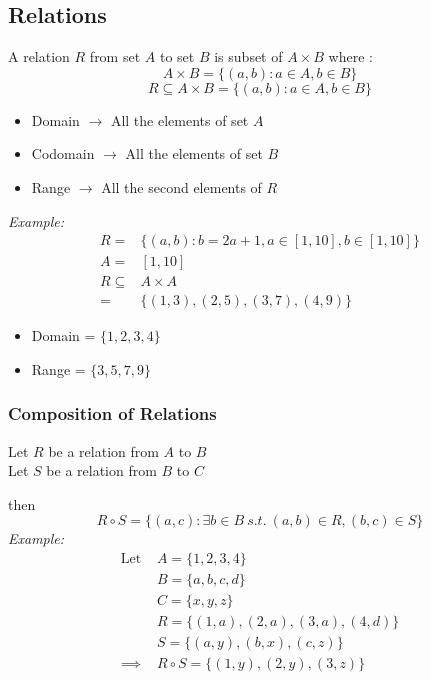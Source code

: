 \documentclass[11pt,letterpaper]{article}
\newenvironment{example}                             
        {\noindent\textit{Example:}\\}
	{}
\begin{document}
\subsection{Relations}
A relation $R$ from set $A$ to set $B$ is subset of $A\times B$ where :
\[
  A\times B = \{(a,b) : a\in A, b\in B\}
\]
\[
  R \subseteq A \times B = \{(a,b) : a\in A, b\in B\}
\]

\begin{itemize}
  \item Domain $\rightarrow$ All the elements of set $A$
  \item Codomain $\rightarrow$ All the elements of set $B$
  \item Range $\rightarrow$ All the second elements of $R$
\end{itemize}
\begin{example}
  \begin{align*}
    R = & \{ (a,b) : b = 2a + 1, a \in [1,10] , b \in [1,10]\}\\
    A = & [1,10]\\
    R \subseteq & A \times A\\
    = & \{(1,3),(2,5),(3,7),(4,9)\}
  \end{align*}
  \begin{itemize}
    \item Domain = $\{1,2,3,4\}$
    \item Range = $\{3,5,7,9\}$
  \end{itemize}
\end{example}
\subsubsection{Composition of Relations}
Let $R$ be a relation from $A$ to $B$\\
Let $S$ be a relation from $B$ to $C$

then 
\[
  R \circ S = \{(a,c) : \exists b \in B \ s.t.\ (a,b) \in R, (b,c) \in S\}
\]
\begin{example}
  \begin{align*}
    \text{Let } & A = \{1,2,3,4\} \\
        & B = \{a,b,c,d\} \\
        & C = \{x,y,z\}\\
        & R = \{(1,a), (2,a), (3,a), (4,d)\}\\
        & S = \{(a,y), (b,x), (c,z)\}\\
    \implies & R \circ S = \{(1,y), (2,y), (3,z)\}
  \end{align*}
\end{example}
\end{document}
